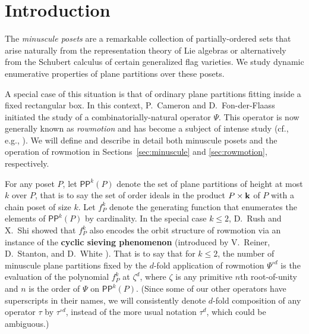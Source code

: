 \documentclass[12pt]{amsart}
\theoremstyle{definition}
\theoremstyle{remark}
\numberwithin{equation}{section}
\newcommand{\pp}{\ensuremath{\mathsf{PP}}}
\begin{document}
\maketitle


%
\section{Introduction}
%
\label{sec:introduction}

The \emph{minuscule posets} are a remarkable collection of partially-ordered sets that arise naturally from the representation theory of Lie algebras or alternatively from the Schubert calculus of certain generalized flag varieties. We study dynamic enumerative properties of plane partitions over these posets.

A special case of this situation is that of ordinary plane partitions fitting inside a fixed rectangular box. In this context, P.~Cameron and D.~Fon-der-Flaass \cite{Cameron.Fonderflaass} initiated the study of a combinatorially-natural operator $\Psi$. This operator is now generally known as \emph{rowmotion} and has become a subject of intense study (cf., e.g., \cite{Panyushev,Striker.Williams,Armstrong.Stump.Thomas,Rush.Shi,Einstein.Propp,Propp.Roby,Grinberg.Roby:2,Grinberg.Roby:1,DPS,Vorland}).
We will define and describe in detail both minuscule posets and the operation of rowmotion in Sections~\ref{sec:minuscule} and \ref{sec:rowmotion}, respectively.

For any poset $P$, let $\pp^k(P)$ denote the set of plane partitions of height at most $k$ over $P$, that is to say the set of order ideals in the product $P \times {\bf k}$ of $P$ with a chain poset of size $k$. Let $f_P^k$ denote the generating function that enumerates the elements of $\pp^k(P)$  by cardinality. In the special case $k \leq 2$, D.~Rush and X.~Shi \cite{Rush.Shi} showed that $f_P^k$ also encodes the orbit structure of rowmotion via an instance of the {\bf cyclic sieving phenomenon} (introduced by V.~Reiner, D.~Stanton, and D.~White \cite{Reiner.Stanton.White}). That is to say that for $k \leq 2$, the number of minuscule plane partitions fixed by the $d$-fold application of rowmotion $\Psi^{\circ d}$ is the evaluation of the polynomial $f_P^k$ at $\zeta^d$, where $\zeta$ is any primitive $n$th root-of-unity and $n$ is the order of $\Psi$ on $\pp^k(P)$. (Since some of our other operators have superscripts in their names, we will consistently denote $d$-fold composition of any operator $\tau$ by $\tau^{\circ d}$, instead of the more usual notation $\tau^d$, which could be ambiguous.)
\end{document}

